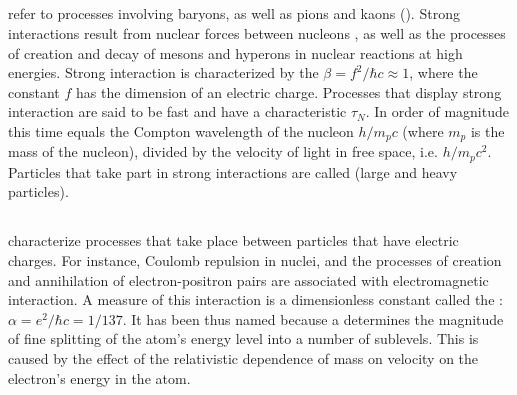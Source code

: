 \subsection{}\label{43.2.6}  refer to processes involving baryons, as well as pions and kaons (). Strong interactions result from nuclear forces between nucleons , as well as the processes of creation and decay of mesons and hyperons in nuclear reactions at high energies. Strong interaction is characterized by the  $\beta = f^{2}/\hbar c \approx 1$, where the constant $f$ has the dimension of an electric charge. Processes that display strong interaction are said to be fast and have a characteristic
 $\tau_{N}$. In order of magnitude this time equals the Compton wavelength of the nucleon $h/m_{p} c$ (where $m_{p}$ is the mass of the nucleon), divided by the velocity of light in free space, i.e. $h/m_{p} c^{2}$.
Particles that take part in strong interactions are called  (large and heavy particles).

\subsection{}\label{43.2.7}  characterize processes that take place between particles that have electric charges. For instance, Coulomb repulsion in nuclei, and the processes of creation and annihilation of electron-positron pairs are associated with electromagnetic interaction. A measure of this interaction is a dimensionless constant called the : $\alpha = e^{2}/\hbar c = 1/137$. It has been thus named because a determines the magnitude of fine splitting of the atom's energy level into a number of sublevels. This is caused by the effect of the relativistic dependence of mass on velocity  on
the electron's energy in the atom. 

